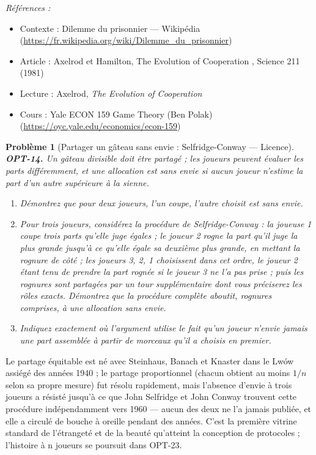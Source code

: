 \documentclass[11pt]{article}
\newtheorem{problem}{Problème}
\newenvironment{refs}{\par\small\noindent\emph{Références :}\begin{itemize}\setlength\itemsep{0pt}}{\end{itemize}\normalsize}
\begin{document}
\begin{refs}
\item Contexte : Dilemme du prisonnier --- Wikipédia (\url{https://fr.wikipedia.org/wiki/Dilemme_du_prisonnier})
\item Article : Axelrod et Hamilton, \og{} The Evolution of Cooperation \fg{}, Science 211 (1981)
\item Lecture : Axelrod, \textit{The Evolution of Cooperation}
\item Cours : Yale ECON 159 Game Theory (Ben Polak) (\url{https://oyc.yale.edu/economics/econ-159})
\end{refs}

\bigskip

\begin{problem}[{Partager un gâteau sans envie : Selfridge-Conway --- Licence}]
\textbf{OPT-14.} Un gâteau divisible doit être partagé ; les joueurs peuvent évaluer les parts différemment, et une allocation est \textit{sans envie} si aucun joueur n'estime la part d'un autre supérieure à la sienne.
\begin{enumerate}
\item[(a)] Démontrez que pour deux joueurs, \og{} l'un coupe, l'autre choisit \fg{} est sans envie.
\item[(b)] Pour trois joueurs, considérez la procédure de Selfridge-Conway : la joueuse 1 coupe trois parts qu'elle juge égales ; le joueur 2 rogne la part qu'il juge la plus grande jusqu'à ce qu'elle égale sa deuxième plus grande, en mettant la rognure de côté ; les joueurs 3, 2, 1 choisissent dans cet ordre, le joueur 2 étant tenu de prendre la part rognée si le joueur 3 ne l'a pas prise ; puis les rognures sont partagées par un tour supplémentaire dont vous préciserez les rôles exacts. Démontrez que la procédure complète aboutit, rognures comprises, à une allocation sans envie.
\item[(c)] Indiquez exactement où l'argument utilise le fait qu'un joueur n'envie jamais une part assemblée à partir de morceaux qu'il a choisis en premier.
\end{enumerate}

\end{problem}

\noindent Le partage équitable est né avec Steinhaus, Banach et Knaster dans le Lwów assiégé des années 1940 ; le partage proportionnel (chacun obtient au moins $1/n$ selon sa propre mesure) fut résolu rapidement, mais l'absence d'envie à trois joueurs a résisté jusqu'à ce que John Selfridge et John Conway trouvent cette procédure indépendamment vers 1960 --- aucun des deux ne l'a jamais publiée, et elle a circulé de bouche à oreille pendant des années. C'est la première vitrine standard de l'étrangeté et de la beauté qu'atteint la conception de protocoles ; l'histoire à n joueurs se poursuit dans OPT-23.
\end{document}
